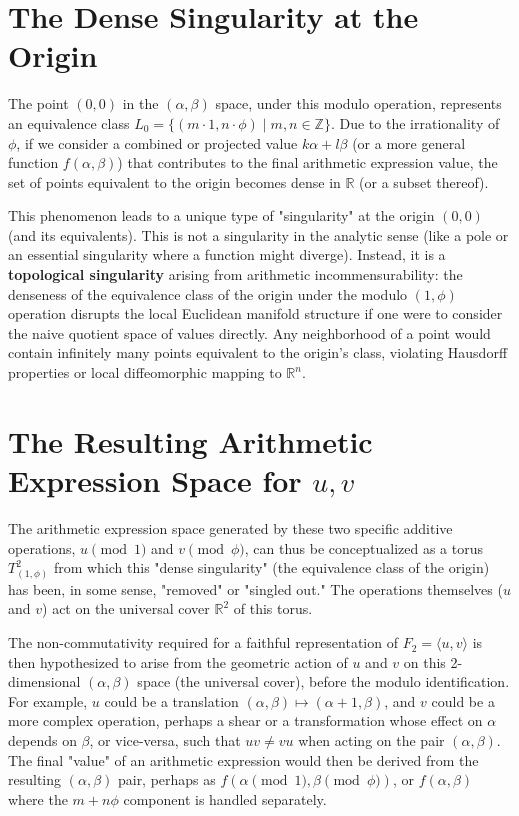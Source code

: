 \documentclass[12pt, a4paper]{article}
\begin{document}
\section{The Dense Singularity at the Origin}
The point $(0,0)$ in the $(\alpha, \beta)$ space, under this modulo operation, represents an equivalence class $L_0 = \{ (m \cdot 1, n \cdot \phi) \mid m,n \in \mathbb{Z} \}$.
Due to the irrationality of $\phi$, if we consider a combined or projected value $k\alpha + l\beta$ (or a more general function $f(\alpha, \beta)$) that contributes to the final arithmetic expression value, the set of points equivalent to the origin becomes dense in $\mathbb{R}$ (or a subset thereof).

This phenomenon leads to a unique type of "singularity" at the origin $(0,0)$ (and its equivalents). This is not a singularity in the analytic sense (like a pole or an essential singularity where a function might diverge). Instead, it is a \textbf{topological singularity} arising from arithmetic incommensurability: the denseness of the equivalence class of the origin under the modulo $(1, \phi)$ operation disrupts the local Euclidean manifold structure if one were to consider the naive quotient space of values directly. Any neighborhood of a point would contain infinitely many points equivalent to the origin's class, violating Hausdorff properties or local diffeomorphic mapping to $\mathbb{R}^n$.

\section{The Resulting Arithmetic Expression Space for $u,v$}
The arithmetic expression space generated by these two specific additive operations, $u \pmod 1$ and $v \pmod \phi$, can thus be conceptualized as a torus $T^2_{(1,\phi)}$ from which this "dense singularity" (the equivalence class of the origin) has been, in some sense, "removed" or "singled out." The operations themselves ($u$ and $v$) act on the universal cover $\mathbb{R}^2$ of this torus.

The non-commutativity required for a faithful representation of $F_2 = \langle u, v \rangle$ is then hypothesized to arise from the geometric action of $u$ and $v$ on this 2-dimensional $(\alpha, \beta)$ space (the universal cover), before the modulo identification. For example, $u$ could be a translation $(\alpha, \beta) \mapsto (\alpha+1, \beta)$, and $v$ could be a more complex operation, perhaps a shear or a transformation whose effect on $\alpha$ depends on $\beta$, or vice-versa, such that $uv \neq vu$ when acting on the pair $(\alpha, \beta)$. The final "value" of an arithmetic expression would then be derived from the resulting $(\alpha, \beta)$ pair, perhaps as $f(\alpha \pmod 1, \beta \pmod \phi)$, or $f(\alpha, \beta)$ where the $m+n\phi$ component is handled separately.
\end{document}
